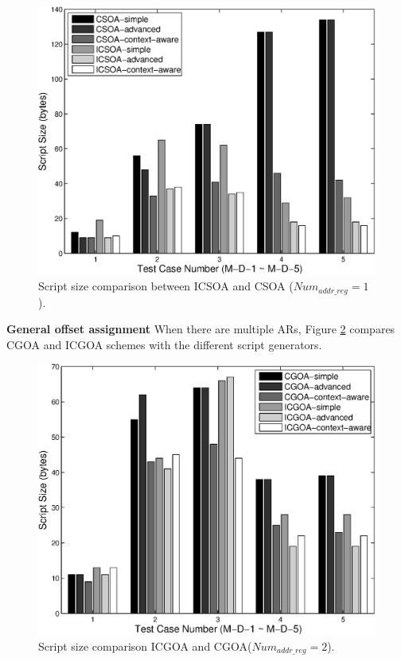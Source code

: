 \begin{figure}[htbp]
\centering
\includegraphics[scale=0.6]{./figures/update1.eps}
\caption{Script size comparison between ICSOA and CSOA ($Num_{addr\_reg} = 1$).}
\label{update}
\vspace{-0.1in}
\end{figure}

\textbf{General offset assignment}
When there are multiple ARs, Figure \ref{update2} compares CGOA and ICGOA schemes with the different script generators. 

\begin{figure}[htbp]
\centering
\includegraphics[scale=0.6]{./figures/updatem.eps}
\caption{Script size comparison ICGOA and CGOA($Num_{addr\_reg} = 2$).}
\label{update2}
\vspace{-0.2in}
\end{figure}

